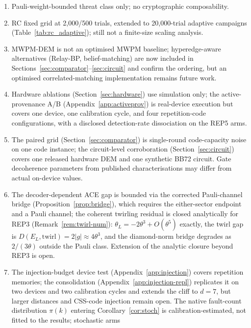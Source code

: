 \documentclass[11pt,a4paper]{article}
\begin{document}
\begin{enumerate}[leftmargin=1.4em]
  \item Pauli-weight-bounded threat class only; no cryptographic composability.
  \item RC fixed grid at 2{,}000/500 trials, extended to
    20{,}000-trial adaptive campaigns
    (Table~\ref{tab:rc_adaptive}); still not a finite-size scaling
    analysis.
  \item MWPM-DEM is not an optimised MWPM baseline; hyperedge-aware
    alternatives (Relay-BP, belief-matching) are now included in
    Sections~\ref{sec:comparator}--\ref{sec:circuit} and confirm the
    ordering, but an optimised correlated-matching implementation remains
    future work.
  \item Hardware ablations (Section~\ref{sec:hardware}) use simulation only;
    the active-provenance A/B (Appendix~\ref{app:activeprov}) is real-device
    execution but covers one device, one calibration cycle, and four
    repetition-code configurations, with a disclosed detection-rate
    dissociation on the REP5 arms.
  \item The paired grid (Section~\ref{sec:comparator}) is single-round
    code-capacity noise on one code instance; the circuit-level
    corroboration (Section~\ref{sec:circuit}) covers one released hardware
    DEM and one synthetic BB72 circuit. Gate decoherence parameters from
    published characterisations may differ from actual on-device values.
  \item The decoder-dependent ACE gap is bounded via the corrected
    Pauli-channel bridge (Proposition~\ref{prop:bridge}), which requires
    the either-sector endpoint and a Pauli channel; the coherent
    twirling residual is closed analytically for REP3
    (Remark~\ref{rem:twirl-num}): $\theta_L=-2\theta^3+O(\theta^5)$
    exactly, the twirl gap is $D(E_L,\mathrm{twirl})=2|g|\approx4\theta^3$,
    and the diamond-norm bridge degrades as $2/(3\theta)$ outside the
    Pauli class. Extension of the analytic closure beyond REP3 is open.
  \item The injection-budget device test (Appendix~\ref{app:injection})
    covers repetition memories; the consolidation
    (Appendix~\ref{app:injection-repl}) replicates it on two devices and
    two calibration cycles and extends the cliff to $d{=}7$, but larger
    distances and CSS-code injection remain open. The native fault-count
    distribution $\pi(k)$ entering Corollary~\ref{cor:stoch} is
    calibration-estimated, not fitted to the results; stochastic arms

\end{enumerate}
\end{document}
